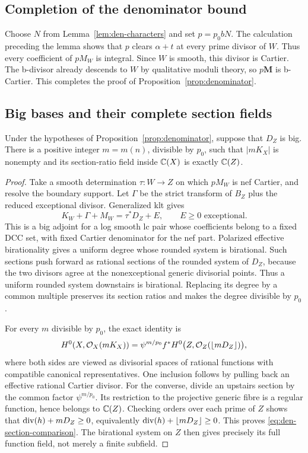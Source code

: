 \subsection{Completion of the denominator bound}

Choose $N$ from Lemma~\ref{lem:den-characters} and set $p=p_0bN$.
The calculation preceding the lemma shows that $p$ clears
$\alpha+t$ at every prime divisor of $W$. Thus every coefficient
of $pM_W$ is integral. Since $W$ is smooth, this divisor is
Cartier. The b-divisor already descends to $W$ by qualitative
moduli theory, so $p\mathbf M$ is b-Cartier. This completes the
proof of Proposition~\ref{prop:denominator}.

\subsection{Big bases and their complete section fields}

\begin{corollary}\label{cor:big-base}
Under the hypotheses of Proposition~\ref{prop:denominator}, suppose
that $D_Z$ is big.  There is a positive integer $m=m(n)$, divisible
by $p_0$, such that $|mK_X|$ is nonempty and its section-ratio field
inside $\mathbb C(X)$ is exactly $\mathbb C(Z)$.
\end{corollary}

\begin{proof}
Take a smooth determination $\tau:W\to Z$ on which $pM_W$ is
nef Cartier, and resolve the boundary support.  Let $\Gamma$ be
the strict transform of $B_Z$ plus the reduced exceptional divisor.
Generalized klt gives
\[
 K_W+\Gamma+M_W=\tau^*D_Z+E,
 \qquad E\geq0\text{ exceptional}.
\]
This is a big adjoint for a log smooth lc pair whose coefficients
belong to a fixed DCC set, with fixed Cartier denominator for the
nef part.  Polarized effective birationality
\cite[Theorem~1.3]{BirkarZhang2016} gives a uniform degree whose
rounded system is birational.  Such sections push forward as
rational sections of the rounded system of $D_Z$, because the
two divisors agree at the nonexceptional generic divisorial points.
Thus a uniform rounded system downstairs is birational.  Replacing
its degree by a common multiple preserves its section ratios and
makes the degree divisible by $p_0$.

For every $m$ divisible by $p_0$, the exact identity is
\begin{equation}\label{eq:den-section-comparison}
 H^0(X,\mathcal O_X(mK_X))
 =\psi^{m/p_0}f^*
 H^0\bigl(Z,\mathcal O_Z(\lfloor mD_Z\rfloor)\bigr),
\end{equation}
where both sides are viewed as divisorial spaces of rational
functions with compatible canonical representatives.  One
inclusion follows by pulling back an effective rational Cartier
divisor.  For the converse, divide an upstairs section by the common
factor $\psi^{m/p_0}$.  Its restriction to the projective generic
fibre is a regular function, hence belongs to $\mathbb C(Z)$.  Checking
orders over each prime of $Z$ shows that
$\operatorname{div}(h)+mD_Z\geq0$, equivalently
$\operatorname{div}(h)+\lfloor mD_Z\rfloor\geq0$.  This proves
\eqref{eq:den-section-comparison}.  The birational system on $Z$
then gives precisely its full function field, not merely a finite
subfield.
\end{proof}

